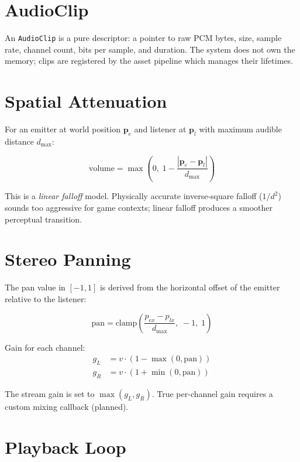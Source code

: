 \documentclass[12pt, a4paper]{report}
\theoremstyle{definition}
\theoremstyle{remark}
\begin{document}
\section{AudioClip}

An \texttt{AudioClip} is a pure descriptor: a pointer to raw PCM bytes,
size, sample rate, channel count, bits per sample, and duration.
The system does not own the memory; clips are registered by the asset
pipeline which manages their lifetimes.

\section{Spatial Attenuation}

For an emitter at world position $\mathbf{p}_e$ and listener at
$\mathbf{p}_l$ with maximum audible distance $d_\text{max}$:

\begin{equation}
\text{volume} = \max\!\left(0,\; 1 - \frac{|\mathbf{p}_e - \mathbf{p}_l|}{d_\text{max}}\right)
\label{eq:audio-volume}
\end{equation}

This is a \emph{linear falloff} model. Physically accurate inverse-square
falloff ($1/d^2$) sounds too aggressive for game contexts; linear falloff
produces a smoother perceptual transition.

\section{Stereo Panning}

The pan value in $[-1, 1]$ is derived from the horizontal offset of the
emitter relative to the listener:

\begin{equation}
\text{pan} = \text{clamp}\!\left(\frac{p_{ex} - p_{lx}}{d_\text{max}},\; -1,\; 1\right)
\end{equation}

Gain for each channel:
\begin{align}
  g_L &= v \cdot (1 - \max(0, \text{pan})) \\
  g_R &= v \cdot (1 + \min(0, \text{pan}))
\end{align}

The stream gain is set to $\max(g_L, g_R)$. True per-channel gain
requires a custom mixing callback (planned).

\section{Playback Loop}
\end{document}
